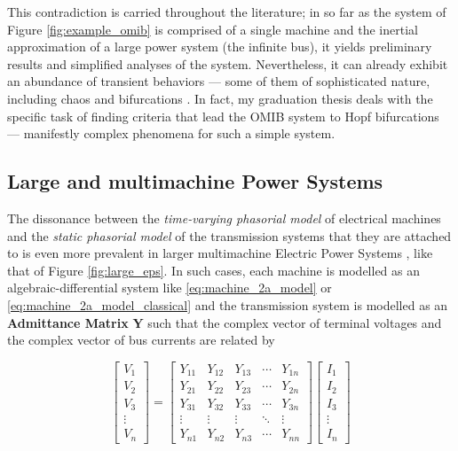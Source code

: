 	This contradiction is carried throughout the literature; in so far as the system of Figure \ref{fig:example_omib} is comprised of a single machine and the inertial approximation of a large power system (the infinite bus), it yields preliminary results and simplified analyses of the system. Nevertheless, it can already exhibit an abundance of transient behaviors — some of them of sophisticated nature, including chaos  and bifurcations . In fact, my graduation thesis \cite{Volpato2017} deals with the specific task of finding criteria that lead the OMIB system to Hopf bifurcations — manifestly complex phenomena for such a simple system.

\subsection{Large and multimachine Power Systems}\label{subsec:largemulti} %

	The dissonance between the \textit{time-varying phasorial model} of electrical machines and the \textit{static phasorial model} of the transmission systems that they are attached to is even more prevalent in larger multimachine Electric Power Systems , like that of Figure \ref{fig:large_eps}. In such cases, each machine is modelled as an algebraic-differential system like \eqref{eq:machine_2a_model} or \eqref{eq:machine_2a_model_classical} and the transmission system is modelled as an \textbf{Admittance Matrix} $\mathbf{Y}$ such that the complex vector of terminal voltages and the complex vector of bus currents are related by

\begin{equation} \left[\begin{array}{c} V_1 \\[3mm] V_2 \\[3mm] V_3 \\[3mm]\vdots \\[3mm] V_n \end{array}\right] = \left[\begin{array}{ccccc} Y_{11} & Y_{12} & Y_{13} & \cdots & Y_{1n} \\[3mm] Y_{21} & Y_{22} & Y_{23} & \cdots & Y_{2n} \\[3mm] Y_{31} & Y_{32} & Y_{33} & \cdots & Y_{3n} \\[3mm] \vdots & \vdots & \vdots & \ddots & \vdots \\[3mm] Y_{n1} & Y_{n2} & Y_{n3} & \cdots & Y_{nn} \end{array}\right] \left[\begin{array}{c} I_1 \\[3mm] I_2 \\[3mm] I_3 \\[3mm] \vdots \\[3mm] I_n \end{array}\right] \label{eq:multimachine_admittance}\end{equation}

